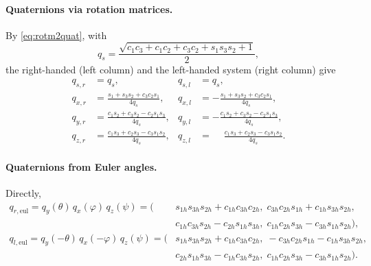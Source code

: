 \documentclass{article}
\theoremstyle{plain}
\theoremstyle{definition}
\begin{document}
\paragraph{Quaternions via rotation matrices.} By \eqref{eq:rotm2quat}, with
\begin{equation}
  q_s = \frac{\sqrt{c_1c_3 + c_1c_2 + c_3c_2 + s_1s_3s_2 + 1}}{2},
\end{equation}
the right-handed (left column) and the left-handed system (right column) give
\begin{align}
  q_{s,r} &= q_s, & q_{s,l} &= q_s, \\
  q_{x,r} &= \frac{s_1 + s_3s_2 + c_3c_2s_1}{4q_s}, & q_{x,l} &= -\frac{s_1 + s_3s_2 + c_3c_2s_1}{4q_s}, \\
  q_{y,r} &= \frac{c_1s_2 + c_3s_2 - c_2s_1s_3}{4q_s}, & q_{y,l} &= -\frac{c_1s_2 + c_3s_2 - c_2s_1s_3}{4q_s}, \\
  q_{z,r} &= \frac{c_1s_3 + c_2s_3 - c_3s_1s_2}{4q_s}, & q_{z,l} &= \phantom{-}\frac{c_1s_3 + c_2s_3 - c_3s_1s_2}{4q_s}.
\end{align}

\paragraph{Quaternions from Euler angles.} Directly,
\begin{align}
  q_{r,\mathrm{eul}} = q_y(\theta)\,q_x(\varphi)\,q_z(\psi) = \bigl(
    &s_{1h}s_{3h}s_{2h} + c_{1h}c_{3h}c_{2h},\;
     c_{3h}c_{2h}s_{1h} + c_{1h}s_{3h}s_{2h}, \nonumber\\
    &c_{1h}c_{3h}s_{2h} - c_{2h}s_{1h}s_{3h},\;
     c_{1h}c_{2h}s_{3h} - c_{3h}s_{1h}s_{2h} \bigr), \\
  q_{l,\mathrm{eul}} = q_y(-\theta)\,q_x(-\varphi)\,q_z(\psi) = \bigl(
    &s_{1h}s_{3h}s_{2h} + c_{1h}c_{3h}c_{2h},\;
     -c_{3h}c_{2h}s_{1h} - c_{1h}s_{3h}s_{2h}, \nonumber\\
    &c_{2h}s_{1h}s_{3h} - c_{1h}c_{3h}s_{2h},\;
     c_{1h}c_{2h}s_{3h} - c_{3h}s_{1h}s_{2h} \bigr).
\end{align}
\end{document}
